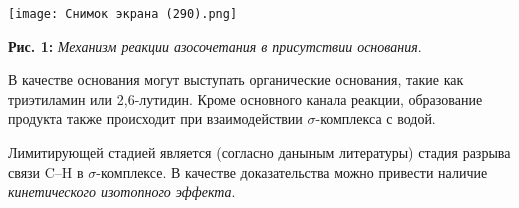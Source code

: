 \documentclass[a4paper]{article}
\begin{document}
\graphicspath{{./images/}}
		\begin{center}
		
			\texttt{[image: Снимок экрана (290).png]}
    \par
\textbf{Рис. 1: }\textit{Механизм реакции азосочетания в присутствии основания}.
 \end{center}
\par \vspace{0.5 cm}

В качестве основания могут выступать органические основания, такие как триэтиламин или 2,6-лутидин. Кроме основного канала реакции, образование продукта также происходит при взаимодействии $\sigma$-комплекса с водой. \par
Лимитирующей стадией является (согласно даныным литературы) стадия разрыва связи C--H в $\sigma$-комплексе. В качестве доказательства можно привести наличие \textit{кинетического изотопного эффекта}.
\par \vspace{0.5 cm}
\end{document}

